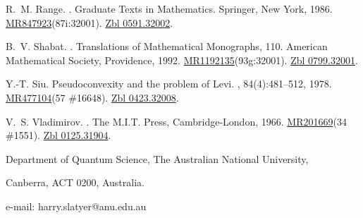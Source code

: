 \documentclass[11pt,a4paper, final, twoside]{article}
\numberwithin{equation}{section}
\begin{document}
\begin{thebibliography}{10}
R.~M. Range.
.
\newblock Graduate Texts in Mathematics. Springer, New York, 1986.
\newblock
  \href{http://www.ams.org/mathscinet-getitem?mr=847923}{MR847923}(87i:32001).
  \href{http://zbmath.org/?q=an:0591.32002}{Zbl 0591.32002}.

B.~V. Shabat.
.
\newblock Translations of Mathematical Monographs, 110. American Mathematical
  Society, Providence, 1992.
\newblock
  \href{http://www.ams.org/mathscinet-getitem?mr=1192135}{MR1192135}(93g:32001).
  \href{http://zbmath.org/?q=an:0799.32001}{Zbl 0799.32001}.

Y.-T. Siu.
\newblock Pseudoconvexity and the problem of {L}evi.
, 84(4):481--512,
  1978.
\newblock \href{http://www.ams.org/mathscinet-getitem?mr=477104}{MR477104}(57
  \#16648). \href{http://zbmath.org/?q=an:0423.32008}{Zbl 0423.32008}.

V.~S. Vladimirov.
.
\newblock The M.I.T. Press, Cambridge-London, 1966.
\newblock \href{http://www.ams.org/mathscinet-getitem?mr=201669}{MR201669}(34
  \#1551). \href{http://zbmath.org/?q=an:0125.31904}{Zbl 0125.31904}.

\end{thebibliography}

{\footnotesize Department of Quantum Science, The Australian National University,}

{\footnotesize Canberra, ACT 0200, Australia.}

{\footnotesize e-mail: harry.slatyer@anu.edu.au}
\end{document}
